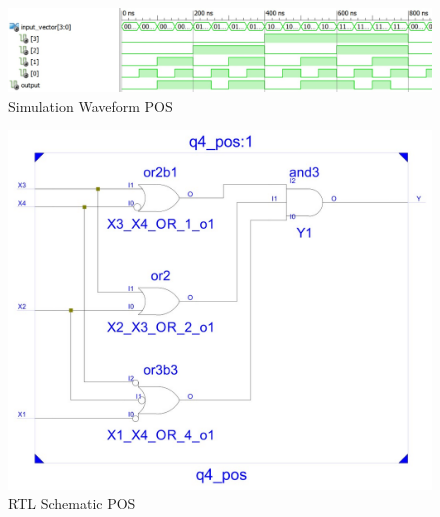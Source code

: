 \documentclass{article}
\begin{document}

\HRule
{}
\HRule

\HRule
{}
\HRule

\HRule
{}
\HRule

\HRule
{}
\HRule

\begin{figure}[H]
    \centering
    \includegraphics[scale=0.55,cframe=blue 0.5pt 3pt]{4pw.jpg}
    \caption{Simulation Waveform  POS}
\end{figure}


\begin{figure}[H]
    \centering
    \includegraphics[scale=0.8,cframe=blue 0.5pt 3pt]{4ps.jpg}
    \caption{RTL Schematic  POS}
\end{figure}




\end{document}
